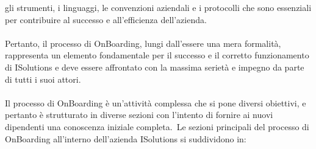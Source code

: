 gli strumenti, i linguaggi, le convenzioni aziendali e i protocolli che sono essenziali per contribuire al successo e 
all'efficienza dell'azienda.
\\ \\
Pertanto, il processo di OnBoarding, lungi dall'essere una mera formalità, rappresenta un elemento fondamentale per il successo 
e il corretto funzionamento di ISolutions e deve essere affrontato con la massima serietà e impegno da parte di tutti i suoi attori.
\\ \\
Il processo di OnBoarding è un'attività complessa che si pone diversi obiettivi, 
e pertanto è strutturato in diverse sezioni con l'intento di fornire ai nuovi 
dipendenti una conoscenza iniziale completa.\ Le sezioni principali del processo di OnBoarding all'interno dell'azienda ISolutions si suddividono in:
